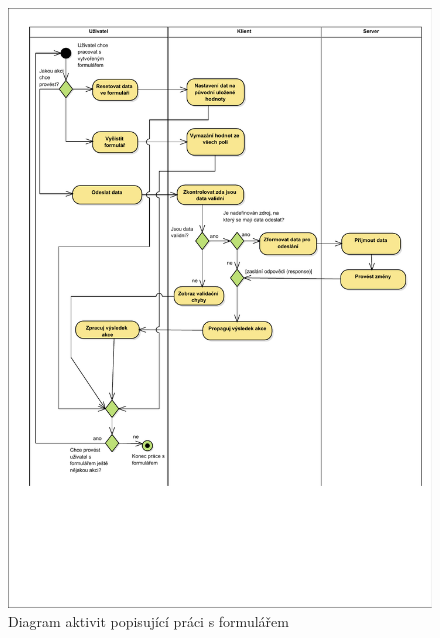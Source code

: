 \begin{figure}
\begin{center}
\includegraphics[width=\textwidth, height=\textheight, keepaspectratio]{figures/formWorkActivityDiagram}
\caption{Diagram aktivit popisující práci s formulářem}
\label{img:formWorkActivityDiagram}
\end{center}
\end{figure}

